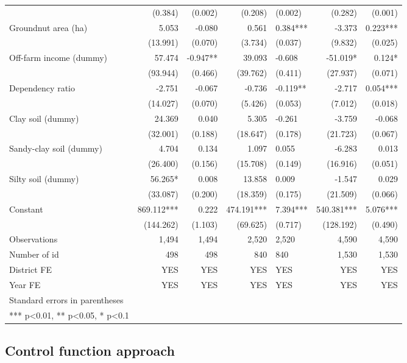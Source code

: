 \documentclass[
]{article}
\begin{document}
\begin{landscape}
\begin{longtable}[t]{lrrrlrr}
 & (0.384) & (0.002) & (0.208) & (0.002) & (0.282) & (0.001)\\
Groundnut area (ha) & 5.053 & -0.080 & 0.561 & 0.384*** & -3.373 & 0.223***\\
\addlinespace
 & (13.991) & (0.070) & (3.734) & (0.037) & (9.832) & (0.025)\\
Off-farm income (dummy) & 57.474 & -0.947** & 39.093 & -0.608 & -51.019* & 0.124*\\
 & (93.944) & (0.466) & (39.762) & (0.411) & (27.937) & (0.071)\\
Dependency ratio & -2.751 & -0.067 & -0.736 & -0.119** & -2.717 & 0.054***\\
 & (14.027) & (0.070) & (5.426) & (0.053) & (7.012) & (0.018)\\
\addlinespace
Clay soil (dummy) & 24.369 & 0.040 & 5.305 & -0.261 & -3.759 & -0.068\\
 & (32.001) & (0.188) & (18.647) & (0.178) & (21.723) & (0.067)\\
Sandy-clay soil (dummy) & 4.704 & 0.134 & 1.097 & 0.055 & -6.283 & 0.013\\
 & (26.400) & (0.156) & (15.708) & (0.149) & (16.916) & (0.051)\\
Silty soil (dummy) & 56.265* & 0.008 & 13.858 & 0.009 & -1.547 & 0.029\\
\addlinespace
 & (33.087) & (0.200) & (18.359) & (0.175) & (21.509) & (0.066)\\
Constant & 869.112*** & 0.222 & 474.191*** & 7.394*** & 540.381*** & 5.076***\\
 & (144.262) & (1.103) & (69.625) & (0.717) & (128.192) & (0.490)\\
Observations & 1,494 & 1,494 & 2,520 & 2,520 & 4,590 & 4,590\\
Number of id & 498 & 498 & 840 & 840 & 1,530 & 1,530\\
\addlinespace
District FE & YES & YES & YES & YES & YES & YES\\
Year FE & YES & YES & YES & YES & YES & YES\\
Standard errors in parentheses &  &  &  &  &  & \\
*** p<0.01, ** p<0.05, * p<0.1 &  &  &  &  &  & \\*
\end{longtable}
\endgroup{}
\end{landscape}

\newpage

\hypertarget{control-function-approach}{%
\subsection{Control function approach}\label{control-function-approach}}
\end{document}
